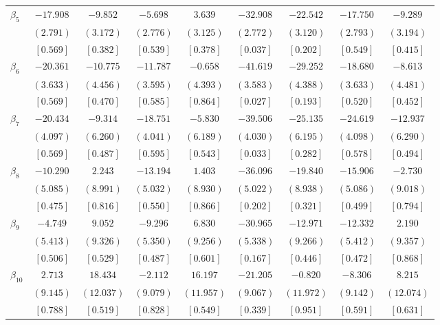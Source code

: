 \documentclass[12pt]{article}
\begin{document}
\begin{table}[h!]
\begin{adjustbox}{width=\textwidth}
\begin{tabular}{lcccccccc}
$\beta_{5}$ & $-17.908$ & $ -9.852$ & $ -5.698$ & $  3.639$ & $-32.908$ & $-22.542$ & $-17.750$ & $ -9.289$ \\
& $(  2.791)$ & $(  3.172)$ & $(  2.776)$ & $(  3.125)$ & $(  2.772)$ & $(  3.120)$ & $(  2.793)$ & $(  3.194)$ \\
& $[  0.569]$ & $[  0.382]$ & $[  0.539]$ & $[  0.378]$ & $[  0.037]$ & $[  0.202]$ & $[  0.549]$ & $[  0.415]$ \\

$\beta_{6}$ & $-20.361$ & $-10.775$ & $-11.787$ & $ -0.658$ & $-41.619$ & $-29.252$ & $-18.680$ & $ -8.613$ \\
& $(  3.633)$ & $(  4.456)$ & $(  3.595)$ & $(  4.393)$ & $(  3.583)$ & $(  4.388)$ & $(  3.633)$ & $(  4.481)$ \\
& $[  0.569]$ & $[  0.470]$ & $[  0.585]$ & $[  0.864]$ & $[  0.027]$ & $[  0.193]$ & $[  0.520]$ & $[  0.452]$ \\

$\beta_{7}$ & $-20.434$ & $ -9.314$ & $-18.751$ & $ -5.830$ & $-39.506$ & $-25.135$ & $-24.619$ & $-12.937$ \\
& $(  4.097)$ & $(  6.260)$ & $(  4.041)$ & $(  6.189)$ & $(  4.030)$ & $(  6.195)$ & $(  4.098)$ & $(  6.290)$ \\
& $[  0.569]$ & $[  0.487]$ & $[  0.595]$ & $[  0.543]$ & $[  0.033]$ & $[  0.282]$ & $[  0.578]$ & $[  0.494]$ \\

$\beta_{8}$ & $-10.290$ & $  2.243$ & $-13.194$ & $  1.403$ & $-36.096$ & $-19.840$ & $-15.906$ & $ -2.730$ \\
& $(  5.085)$ & $(  8.991)$ & $(  5.032)$ & $(  8.930)$ & $(  5.022)$ & $(  8.938)$ & $(  5.086)$ & $(  9.018)$ \\
& $[  0.475]$ & $[  0.816]$ & $[  0.550]$ & $[  0.866]$ & $[  0.202]$ & $[  0.321]$ & $[  0.499]$ & $[  0.794]$ \\

$\beta_{9}$ & $ -4.749$ & $  9.052$ & $ -9.296$ & $  6.830$ & $-30.965$ & $-12.971$ & $-12.332$ & $  2.190$ \\
& $(  5.413)$ & $(  9.326)$ & $(  5.350)$ & $(  9.256)$ & $(  5.338)$ & $(  9.266)$ & $(  5.412)$ & $(  9.357)$ \\
& $[  0.506]$ & $[  0.529]$ & $[  0.487]$ & $[  0.601]$ & $[  0.167]$ & $[  0.446]$ & $[  0.472]$ & $[  0.868]$ \\

$\beta_{10}$ & $  2.713$ & $ 18.434$ & $ -2.112$ & $ 16.197$ & $-21.205$ & $ -0.820$ & $ -8.306$ & $  8.215$ \\
& $(  9.145)$ & $( 12.037)$ & $(  9.079)$ & $( 11.957)$ & $(  9.067)$ & $( 11.972)$ & $(  9.142)$ & $( 12.074)$ \\
& $[  0.788]$ & $[  0.519]$ & $[  0.828]$ & $[  0.549]$ & $[  0.339]$ & $[  0.951]$ & $[  0.591]$ & $[  0.631]$ \\


\end{tabular}
\end{adjustbox}
\end{table}
\end{document}
